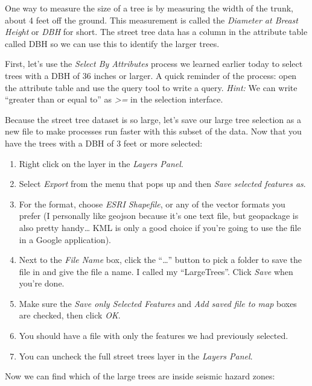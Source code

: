 \documentclass[
]{article}
\providecommand{\tightlist}{%
  \setlength{\itemsep}{0pt}\setlength{\parskip}{0pt}}
\begin{document}
One way to measure the size of a tree is by measuring the width of the trunk, about 4 feet off the ground. This measurement is called the \emph{Diameter at Breast Height} or \emph{DBH} for short. The street tree data has a column in the attribute table called DBH so we can use this to identify the larger trees.

First, let's use the \emph{Select By Attributes} process we learned earlier today to select trees with a DBH of 36 inches or larger. A quick reminder of the process: open the attribute table and use the query tool to write a query. \emph{Hint:} We can write ``greater than or equal to'' as \emph{\textgreater=} in the selection interface.

Because the street tree dataset is so large, let's save our large tree selection as a new file to make processes run faster with this subset of the data. Now that you have the trees with a DBH of 3 feet or more selected:

\begin{enumerate}
\def\labelenumi{\arabic{enumi}.}
\tightlist
\item
  Right click on the layer in the \emph{Layers Panel}.\\
\item
  Select \emph{Export} from the menu that pops up and then \emph{Save selected features as}.\\
\item
  For the format, choose \emph{ESRI Shapefile}, or any of the vector formats you prefer (I personally like geojson because it's one text file, but geopackage is also pretty handy\ldots{} KML is only a good choice if you're going to use the file in a Google application).
\item
  Next to the \emph{File Name} box, click the ``\ldots{}'' button to pick a folder to save the file in and give the file a name. I called my ``LargeTrees''. Click \emph{Save} when you're done.
\item
  Make sure the \emph{Save only Selected Features} and \emph{Add saved file to map} boxes are checked, then click \emph{OK}.
\item
  You should have a file with only the features we had previously selected.
\item
  You can uncheck the full street trees layer in the \emph{Layers Panel}.
\end{enumerate}

Now we can find which of the large trees are inside seismic hazard zones:
\end{document}
